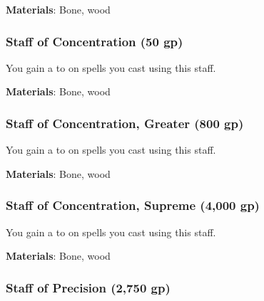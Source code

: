 \textbf{Materials}: Bone, wood


\lowercase{\hypertarget{item:Staff of Concentration}{}}\label{item:Staff of Concentration}
\hypertarget{item:Staff of Concentration}{\subsubsection{Staff of Concentration\hfill{} (50 gp)}}

You gain a   to  on spells you cast using this staff.



\textbf{Materials}: Bone, wood


\lowercase{\hypertarget{item:Staff of Concentration, Greater}{}}\label{item:Staff of Concentration, Greater}
\hypertarget{item:Staff of Concentration, Greater}{\subsubsection{Staff of Concentration, Greater\hfill{} (800 gp)}}

You gain a   to  on spells you cast using this staff.



\textbf{Materials}: Bone, wood


\lowercase{\hypertarget{item:Staff of Concentration, Supreme}{}}\label{item:Staff of Concentration, Supreme}
\hypertarget{item:Staff of Concentration, Supreme}{\subsubsection{Staff of Concentration, Supreme\hfill{} (4,000 gp)}}

You gain a   to  on spells you cast using this staff.



\textbf{Materials}: Bone, wood


\lowercase{\hypertarget{item:Staff of Precision}{}}\label{item:Staff of Precision}
\hypertarget{item:Staff of Precision}{\subsubsection{Staff of Precision\hfill{} (2,750 gp)}}

